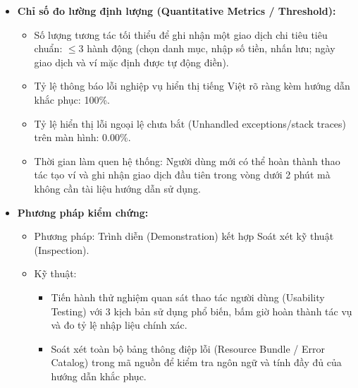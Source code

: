 \documentclass[11pt,a4paper]{article}
\providecommand{\tightlist}{
  \setlength{\itemsep}{0pt}\setlength{\parskip}{0pt}}
\begin{document}
\begin{itemize}
\begin{itemize}
    \begin{itemize}
    \tightlist
    \item
      Toàn bộ thông báo lỗi xác thực dữ liệu đầu vào và vi phạm quy tắc
      nghiệp vụ phải được thể hiện bằng ngôn ngữ tiếng Việt tự nhiên,
      ngắn gọn, chỉ rõ nguyên nhân phát sinh lỗi và đưa ra hướng xử lý
      khắc phục cụ thể. Ví dụ: khi số dư ví không đủ chi trả khoản chi,
      thông báo hiển thị: "Số dư ví MB Bank hiện tại là 150,000 VNĐ,
      không đủ để chi trả khoản chi 200,000 VNĐ. Vui lòng giảm số tiền
      chi tiêu hoặc chuyển tiền từ ví khác sang".
    \item
      Tuyệt đối không hiển thị các thông báo lỗi kỹ thuật thuần túy, vết
      ngăn xếp ngoại lệ (stack trace) hoặc các mã lỗi hệ thống khó hiểu
      ra giao diện người dùng.
    \end{itemize}
  \end{itemize}
\item
  \textbf{Chỉ số đo lường định lượng (Quantitative Metrics /
  Threshold):}

  \begin{itemize}
  \tightlist
  \item
    Số lượng tương tác tối thiểu để ghi nhận một giao dịch chi tiêu tiêu
    chuẩn: \(\le 3\) hành động (chọn danh mục, nhập số tiền, nhấn lưu;
    ngày giao dịch và ví mặc định được tự động điền).
  \item
    Tỷ lệ thông báo lỗi nghiệp vụ hiển thị tiếng Việt rõ ràng kèm hướng
    dẫn khắc phục: 100\%.
  \item
    Tỷ lệ hiển thị lỗi ngoại lệ chưa bắt (Unhandled exceptions/stack
    traces) trên màn hình: 0.00\%.
  \item
    Thời gian làm quen hệ thống: Người dùng mới có thể hoàn thành thao
    tác tạo ví và ghi nhận giao dịch đầu tiên trong vòng dưới 2 phút mà
    không cần tài liệu hướng dẫn sử dụng.
  \end{itemize}
\item
  \textbf{Phương pháp kiểm chứng:}

  \begin{itemize}
  \tightlist
  \item
    Phương pháp: Trình diễn (Demonstration) kết hợp Soát xét kỹ thuật
    (Inspection).
  \item
    Kỹ thuật:

    \begin{itemize}
    \tightlist
    \item
      Tiến hành thử nghiệm quan sát thao tác người dùng (Usability
      Testing) với 3 kịch bản sử dụng phổ biến, bấm giờ hoàn thành tác
      vụ và đo tỷ lệ nhập liệu chính xác.
    \item
      Soát xét toàn bộ bảng thông điệp lỗi (Resource Bundle / Error
      Catalog) trong mã nguồn để kiểm tra ngôn ngữ và tính đầy đủ của
      hướng dẫn khắc phục.
    \end{itemize}
  \end{itemize}
\end{itemize}
\end{document}

